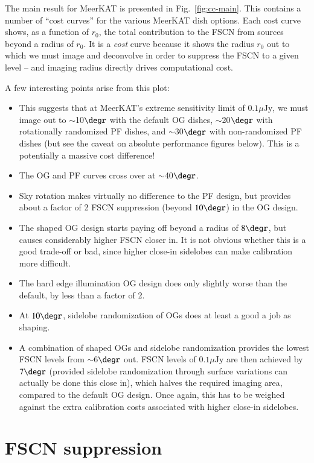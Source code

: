 \documentclass{aa}
\begin{document}
The main result for MeerKAT is presented in Fig.~\ref{fig:cc-main}. This contains a number of ``cost curves'' for the various MeerKAT dish options. Each cost curve shows, as a function of $r_0$, the total contribution to the FSCN from sources beyond a radius of $r_0$. It is a \emph{cost} curve because it shows the radius $r_0$ out to which we must image and deconvolve in order to suppress the FSCN to a given level -- and imaging radius directly drives computational cost. 

A few interesting points arise from this plot:

\begin{itemize}
  \item This suggests that at MeerKAT's extreme sensitivity limit of $0.1 \mu\mathrm{Jy}$, we must image out to $\sim$10$\degr$ with the default OG dishes, $\sim$20$\degr$ with rotationally randomized PF dishes, and $\sim$30$\degr$ with non-randomized PF dishes (but see the caveat on absolute performance figures below). This is a potentially a massive cost difference!
  \item The OG and PF curves cross over at $\sim$40$\degr$.
  \item Sky rotation makes virtually no difference to the PF design, but provides about a factor of 2 FSCN suppression (beyond $10\degr$) in the OG design.
  \item The shaped OG design starts paying off beyond a radius of $8\degr$, but causes considerably higher FSCN closer in. It is not obvious whether this is a good trade-off or bad, since higher close-in sidelobes can make calibration more difficult.
  \item The hard edge illumination OG design does only slightly worse than the default, by less than a factor of 2.
  \item At $10\degr$, sidelobe randomization of OGs does at least a good a job as shaping.
  \item A combination of shaped OGs and sidelobe randomization provides the lowest FSCN levels from $\sim$6$\degr$ out.
  FSCN levels of $0.1 \mu\mathrm{Jy}$ are then achieved by $7\degr$ (provided sidelobe randomization through surface variations can actually be done this close in), which halves the required imaging area, compared to the default OG design. Once again, this has to be weighed against the extra calibration costs associated with higher close-in sidelobes.
\end{itemize}

\section{FSCN suppression}
\end{document}
